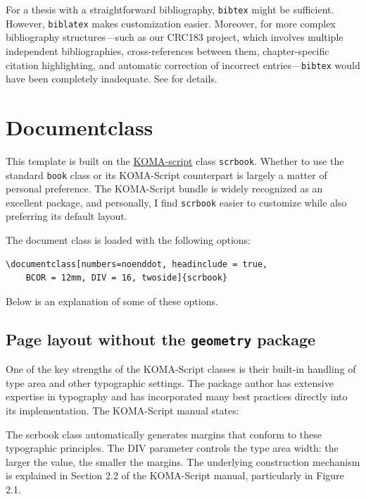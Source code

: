 For a thesis with a straightforward bibliography, \verb|bibtex| might be sufficient. However, \verb|biblatex| makes customization easier. Moreover, for more complex bibliography structures---such as our CRC183 project, which involves multiple independent bibliographies, cross-references between them, chapter-specific citation highlighting, and automatic correction of incorrect entries---\verb|bibtex| would have been completely inadequate.
See  for details.



\section{Documentclass}
This template is built on the \href{https://ctan.org/pkg/koma-script?lang=de}{KOMA-script} class \verb|scrbook|. Whether to use the standard \verb|book| class or its KOMA-Script counterpart is largely a matter of personal preference. The KOMA-Script bundle is widely recognized as an excellent package, and personally, I find \verb|scrbook| easier to customize while also preferring its default layout.

The document class is loaded with the following options:
\begin{lstlisting}
\documentclass[numbers=noenddot, headinclude = true,
	BCOR = 12mm, DIV = 16, twoside]{scrbook}
\end{lstlisting}
Below is an explanation of some of these options.

\subsection{Page layout without the \texttt{geometry} package}
One of the key strengths of the KOMA-Script classes is their built-in handling of type area and other typographic settings. The package author has extensive expertise in typography and has incorporated many best practices directly into its implementation. The KOMA-Script manual states:
  \cite{koma_manual}

The scrbook class automatically generates margins that conform to these typographic principles. The DIV parameter controls the type area width: the larger the value, the smaller the margins. The underlying construction mechanism is explained in Section 2.2 of the KOMA-Script manual, particularly in Figure 2.1.

